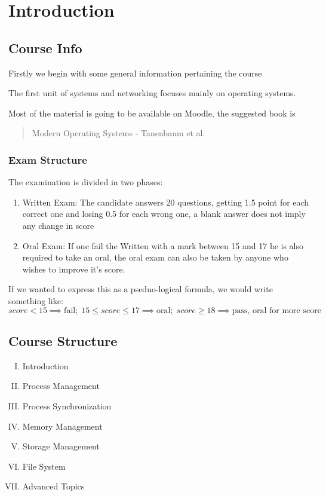 \documentclass[openright, twoside]{report}
\theoremstyle{definition}
\theoremstyle{example}
\begin{document}
	\section{Introduction}
	\subsection{Course Info}
	Firstly we begin with some general information pertaining the course

	The first unit of systems and networking focuses mainly on operating systems.

	Most of the material is going to be available on Moodle, the suggested book is
	\begin{quote}
		Modern Operating Systems - Tanenbaum et al.
	\end{quote}


	\subsubsection{Exam Structure}

	The examination is divided in two phases:

	\begin{enumerate}
		\item Written Exam:
		The candidate answers 20 questions, getting 1.5 point for each correct one and losing 0.5 for each wrong one, a blank answer does not imply any change in score
		\item Oral Exam: 
		If one fail the Written with a mark between 15 and 17 he is also required to take an oral, the oral exam can also be taken by anyone who wishes to improve it's score.
	\end{enumerate}

	If we wanted to express this as a pseduo-logical formula, we would write something like:
	\[ score < 15 \implies \text{fail}; \; 15 \leq score \leq 17 \implies \text{oral}; \; score \geq 18 \implies \text{pass, oral for more score} \]

	\subsection{Course Structure}
	\begin{enumerate}[I.]
		\item Introduction
		\item Process Management
		\item Process Synchronization
		\item Memory Management
		\item Storage Management
		\item File System
		\item Advanced Topics
	\end{enumerate}
\end{document}
